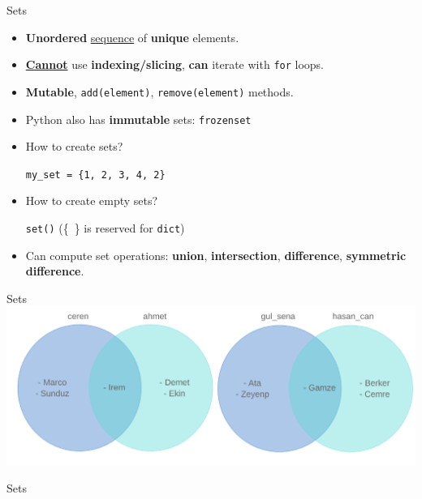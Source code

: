     \begin{frame}{Sets}
        \LARGE
        \begin{itemize}
            \item \textbf{Unordered} \underline{sequence} of \textbf{unique} elements.
           
            \item \underline{\textbf{Cannot}} use \textbf{indexing/slicing}, \textbf{can} iterate with \texttt{for} loops.
            
            \item \textbf{Mutable}, \texttt{add(element)}, \texttt{remove(element)} methods.
            
            \item Python also has \textbf{immutable} sets: \texttt{frozenset}
            
            \item How to create sets? 
           
             \texttt{my\_set = \{1, 2, 3, 4, 2\}}
            \item How to create empty sets?
           
             \texttt{set()} (\{\ \} is reserved for \texttt{dict})
            
            \item Can compute set operations: \textbf{union}, \textbf{intersection}, \textbf{difference}, \textbf{symmetric difference}.
        \end{itemize}
    \end{frame}
    
    \begin{frame}{Sets}
        \centering
        \includegraphics[width=\textwidth]{../Lecture6/images/sections_venn.png}
    \end{frame}
    
    \begin{frame}{Sets}
        \inputminted[frame=single,framesep=2pt]{python3}{../Lecture6/code-examples/sets.py}
    \end{frame}
    
